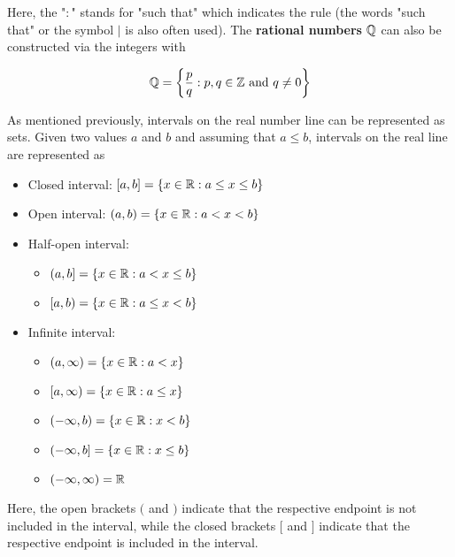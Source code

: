 \noindent Here, the "$:$" stands for "such that" which indicates the rule (the words "such that" or the symbol $|$ is also often used). The \textbf{rational numbers} $\mathbb{Q}$ can also be constructed via the integers with

\begin{equation}
    \mathbb{Q} = \left\{\frac{p}{q} : p,q \in \mathbb{Z} \text{ and } q \neq 0\right\}
\end{equation}

As mentioned previously, intervals on the real number line can be represented as sets. Given two values $a$ and $b$ and assuming that $a \leq b$, intervals on the real line are represented as

\begin{itemize}
    \item Closed interval: $[a,b] = \{x \in \mathbb{R} : a \leq x \leq b\}$ \hfill {}
    \item Open interval: $(a,b) = \{x \in \mathbb{R} : a < x < b\}$ \hfill {}
    \item Half-open interval:
        \begin{itemize}
            \item $(a,b] = \{x \in \mathbb{R} : a < x \leq b\}$ \hfill \intervalinline{a}{b}{(}{]}
            \item $[a,b) = \{x \in \mathbb{R} : a \leq x < b\}$ \hfill \intervalinline{a}{b}{[}{)}
        \end{itemize}
    \item Infinite interval:
        \begin{itemize}
            \item $(a,\infty) = \{x \in \mathbb{R}: a < x\}$ \hfill {}
                \item $[a,\infty) = \{x \in \mathbb{R}: a \leq x\}$ \hfill \intervalinline{a}{$\infty$}{[}{}
                \item $(-\infty,b) = \{x \in \mathbb{R}: x < b\}$ \hfill {}
            \item $(-\infty,b] = \{x \in \mathbb{R}: x \leq b\}$ \hfill \intervalinline{$-\infty$}{b}{}{]}
            \item $(-\infty,\infty) = \mathbb{R}$ \hfill \intervalinline{$-\infty$}{$\infty$}{}{}
        \end{itemize}
\end{itemize}

\noindent Here, the open brackets $($ and $)$ indicate that the respective endpoint is not included in the interval, while the closed brackets $[$ and $]$ indicate that the respective endpoint is included in the interval.

